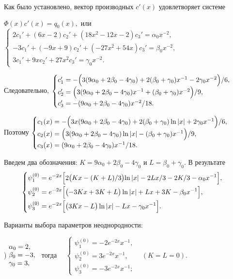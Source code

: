 \documentclass[11pt]{article}
\begin{document}
{%
Как было установлено, вектор производных $c'(x)$ удовлетворяет системе

\smallskip
$\Phi(x)c'(x)=q_0(x),$
или
$\begin{cases}
2c_1' + (6x - 2)c_2' + (18x^2 - 12x - 2)c_3' = \alpha_0 x^{-2}, \\
-3c_1' + (-9x + 9)c_2' + (-27x^2 + 54x)c_3' = \beta_0 x^{-2}, \\
3c_1' + 9x c_2' + 27x^2 c_3' = \gamma_0 x^{-2}.
\end{cases}$

Следовательно,
$\begin{cases} c_1' = -\Bigl( 3(9\alpha_0 + 2\beta_0 -4\gamma_0) + 2(\beta_0 + \gamma_0) x^{-1} - 2\gamma_0 x^{-2} \Bigl)/6,\\
c_2' = \Bigl(3(9\alpha_0 + 2\beta_0 - 4\gamma_0)x^{-1} + (\beta_0 + \gamma_0)x^{-2}\Bigl)/9,\\
c_3' = -(9\alpha_0 + 2\beta_0 - 4\gamma_0)x^{-2}/18.\end{cases}$

Поэтому
$\begin{cases}
c_1(x) = -\Bigl(3x (9\alpha_0 + 2\beta_0 - 4\gamma_0) + 2(\beta_0 + \gamma_0) \ln|x| + 2\gamma_0 x^{-1} \Bigl)/6,\\
c_2(x) = \Bigl(3(9\alpha_0 + 2\beta_0 - 4\gamma_0)\ln |x| - (\beta_0 + \gamma_0)x^{-1}\Bigl)/9,\\
c_3(x) = (9\alpha_0 + 2\beta_0 - 4\gamma_0)x^{-1}/18.\end{cases}$

Введем два обозначения: $K=9\alpha_0+2\beta_0-4\gamma_0$ и $L = \beta_0+\gamma_0.$
В результате
\[
\begin{cases}
\begin{aligned}
\psi_1^{(0)} &= e^{-2x} \Bigl[ 2\bigl( Kx-(K+L)/3 \bigl)\ln |x| - 2Lx/3 - 2K/3 - \alpha_0 x^{-1} \Bigr], \\
\psi_2^{(0)} &= e^{-2x} \Bigl[ \bigl( -3Kx + 3K + L \bigr)\ln |x| + Lx + 3K - \beta_0 x^{-1} \Bigr], \\
\psi_3^{(0)} &= e^{-2x} \Bigl[ \bigl( 3Kx - L \bigr)\ln |x| - Lx - \gamma_0x^{-1} \Bigr].
\end{aligned}
\end{cases}
\]

Варианты выбора параметров неоднородности:

) $\begin{matrix} \alpha_0 = 2,\hfill\\ \beta_0 = -3,\\ \gamma_0 = 3,\hfill \end{matrix}$ \
тогда \ \ $\begin{cases}
\psi_1^{(0)}= -2e^{-2x} x^{-1},\\ \psi_2^{(0)}= 3e^{-2x} x^{-1},\\ \psi_3^{(0)}= -3e^{-2x} x^{-1}; \end{cases}$ \
$(K=L=0).$

}
\end{document}
